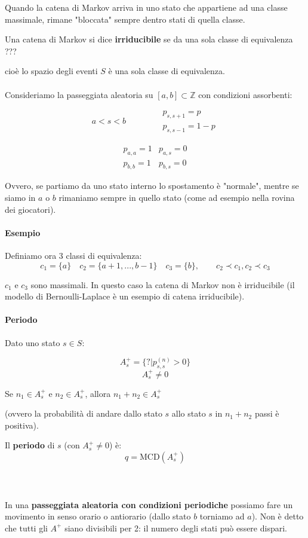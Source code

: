 \documentclass[a4paper,12pt]{book}
\begin{document}
Quando la catena di Markov arriva in uno stato che appartiene ad una classe massimale, rimane "bloccata" sempre dentro stati di quella classe. 

Una catena di Markov si dice \textbf{irriducibile} se da una sola classe di equivalenza ??? %

cioè lo spazio degli eventi $ S $ è una sola classe di equivalenza.
\\
\\
Consideriamo la passeggiata aleatoria su $ [a,b] \subset \mathbb{Z} $ con condizioni assorbenti:

$$ a < s < b \qquad \qquad \begin{array}{c}
 	p_{s,s+1} = p \\
    p_{s,s-1} = 1-p
\end{array}$$

$$ \begin{array}{cc}
	p_{a,a} = 1 & p_{a,s} = 0 \\
	p_{b,b} = 1 & p_{b,s} = 0
\end{array}$$

Ovvero, se partiamo da uno stato interno lo spostamento è "normale", mentre se siamo in $ a $ o $ b $ rimaniamo sempre in quello stato (come ad esempio nella rovina dei giocatori). 

\paragraph{Esempio} Definiamo ora 3 classi di equivalenza:
$$ c_1 = \{a\} \quad c_2 = \{a+1, ..., b-1\} \quad c_3 = \{b\}, \qquad c_2 \prec c_1, c_2 \prec c_3$$ 

$ c_1 $ e $ c_3 $ sono massimali. In questo caso la catena di Markov non è irriducibile (il modello di Bernoulli-Laplace è un esempio di catena irriducibile). 

\paragraph{Periodo} Dato uno stato $ s \in S $:

$$ A^+_s = \{? | p_{s,s}^{(n)} > 0\} $$ %
$$ A^+_s \ne 0 $$

Se $ n_1 \in A^+_s $ e $ n_2 \in A^+_s $, allora $ n_1 + n_2 \in A^+_s $

(ovvero la probabilità di andare dallo stato $ s $ allo stato $ s $ in $ n_1 + n_2 $ passi è positiva).

Il \textbf{periodo} di $ s $ (con $ A^+_s \ne 0 $) è:
$$ q = \text{MCD}(A^+_s) $$\\
\\
\\
In una \textbf{passeggiata aleatoria con condizioni periodiche} possiamo fare un movimento in senso orario o antiorario (dallo stato $ b $ torniamo ad $ a $). Non è detto che tutti gli $ A^+ $ siano divisibili per 2: il numero degli stati può essere dispari. 
\end{document}
